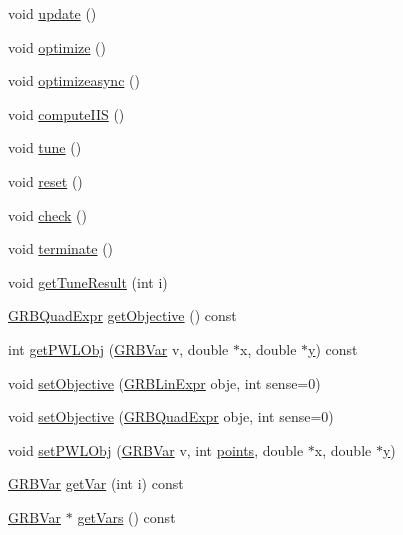 \begin{DoxyCompactItemize}
\item 
void \hyperlink{classGRBModel_a7662994a5e461c9fa82345f93985e043}{update} ()
\item 
void \hyperlink{classGRBModel_a261ee3d0ea71fe57fd484d3c93e4388d}{optimize} ()
\item 
void \hyperlink{classGRBModel_adf9fd231decbafd1bbd06c6488a53b36}{optimizeasync} ()
\item 
void \hyperlink{classGRBModel_a233ec1462a249c1494cee66445319a02}{compute\+I\+IS} ()
\item 
void \hyperlink{classGRBModel_a60b71c3d7a2dbcd8594c3d1fa901e3dd}{tune} ()
\item 
void \hyperlink{classGRBModel_ab9ce968b8366f363a3dca98c2f829947}{reset} ()
\item 
void \hyperlink{classGRBModel_a1c187df2f9bcf41d20687d79d14cd7c0}{check} ()
\item 
void \hyperlink{classGRBModel_a5950fc4eedb549dc38f2f504d6bc8224}{terminate} ()
\item 
void \hyperlink{classGRBModel_a5bc61abf65ff7bce782bfbe822525c06}{get\+Tune\+Result} (int i)
\item 
\hyperlink{classGRBQuadExpr}{G\+R\+B\+Quad\+Expr} \hyperlink{classGRBModel_a101e9eb73e8b2bc384117f8fa1eca662}{get\+Objective} () const 
\item 
int \hyperlink{classGRBModel_a88a22d02a6af050943884a5140a5a45a}{get\+P\+W\+L\+Obj} (\hyperlink{classGRBVar}{G\+R\+B\+Var} v, double $\ast$x, double $\ast$\hyperlink{classes_8txt_a52673b1e0cce0104e52dcd12727f211e}{y}) const 
\item 
void \hyperlink{classGRBModel_a408a224373e26cb163510c5352577d51}{set\+Objective} (\hyperlink{classGRBLinExpr}{G\+R\+B\+Lin\+Expr} obje, int sense=0)
\item 
void \hyperlink{classGRBModel_a487c992f4b9c14eb6b2348f487765fbe}{set\+Objective} (\hyperlink{classGRBQuadExpr}{G\+R\+B\+Quad\+Expr} obje, int sense=0)
\item 
void \hyperlink{classGRBModel_a5b717d74dbef2ce72e7eef2b84316709}{set\+P\+W\+L\+Obj} (\hyperlink{classGRBVar}{G\+R\+B\+Var} v, int \hyperlink{classes_8txt_ae368e6252d0add75ea011d5d90db68ed}{points}, double $\ast$x, double $\ast$\hyperlink{classes_8txt_a52673b1e0cce0104e52dcd12727f211e}{y})
\item 
\hyperlink{classGRBVar}{G\+R\+B\+Var} \hyperlink{classGRBModel_ac27b8102164a63e3c5d1b3e49a36fd54}{get\+Var} (int i) const 
\item 
\hyperlink{classGRBVar}{G\+R\+B\+Var} $\ast$ \hyperlink{classGRBModel_a10f0d8daaf5fde5084c4f0536a6b42f0}{get\+Vars} () const 

\end{DoxyCompactItemize}
